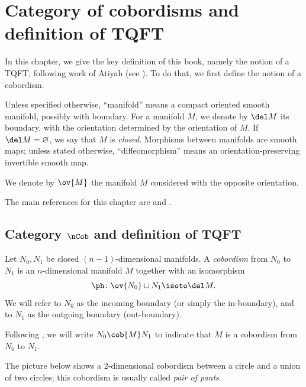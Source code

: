 \chapter{Category of cobordisms and definition of TQFT}\label{c:cobordisms}

In this chapter, we give the key definition of this book, namely the notion of a
TQFT, following work of Atiyah (see ). To do that, we first define
the notion of a cobordism.

Unless specified otherwise, ``manifold'' means a compact oriented smooth
manifold, possibly with boundary. For a manifold $M$, we denote by $\del M$ its
boundary, with the orientation determined by the orientation of $M$. If $\del
M=\varnothing$, we say that $M$ is \emph{closed}. Morphisms between manifolds
are smooth maps; unless stated otherwise, ``diffeomorphism'' means an
orientation-preserving invertible smooth map.

We denote by $\ov{M}$ the manifold $M$ considered with the
opposite orientation.

The main references for this chapter are  and
.

\section{Category $\nCob$ and definition of TQFT}\label{s:TQFT-def}
\begin{definition}\label{d:cobordism}
Let $N_0, N_1$ be closed $(n-1)$-dimensional manifolds. A \emph{cobordism}
from $N_0$ to $N_1$ is an $n$-dimensional manifold $M$ together with
an isomorphism
$$
  \ph\colon \ov{N_0}\sqcup N_1 \isoto \del M.
$$
We will refer to $N_0$ as the incoming boundary (or simply the in-boundary),
and to $N_1$ as the outgoing boundary (out-boundary).

Following , we will write $N_0\cob{M} N_1$ to indicate that $M$ is a
cobordism from $N_0$ to $N_1$.
\end{definition}

The picture below shows a 2-dimensional cobordism between a circle and a union
of two circles; this cobordism is usually called \emph{pair of pants}.
\begin{center}
\end{center}

